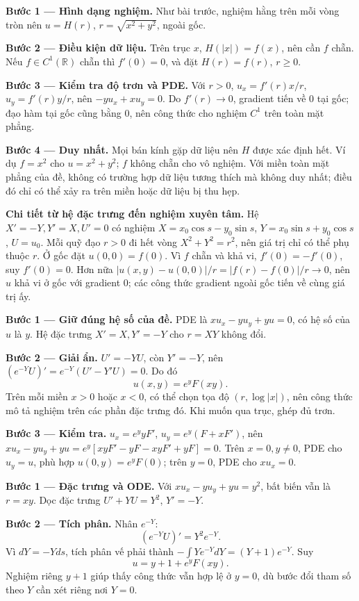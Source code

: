 \textbf{Bước 1 — Hình dạng nghiệm.} Như bài trước, nghiệm hằng trên mỗi vòng tròn nên $u=H(r)$, $r=\sqrt{x^2+y^2}$, ngoài gốc.

\textbf{Bước 2 — Điều kiện dữ liệu.} Trên trục $x$, $H(|x|)=f(x)$, nên cần $f$ chẵn. Nếu $f\in C^1(\mathbb R)$ chẵn thì $f'(0)=0$, và đặt $H(r)=f(r)$, $r\ge0$.

\textbf{Bước 3 — Kiểm tra độ trơn và PDE.} Với $r>0$, $u_x=f'(r)x/r$, $u_y=f'(r)y/r$, nên $-yu_x+xu_y=0$. Do $f'(r)\to0$, gradient tiến về 0 tại gốc; đạo hàm tại gốc cũng bằng 0, nên công thức cho nghiệm $C^1$ trên toàn mặt phẳng.

\textbf{Bước 4 — Duy nhất.} Mọi bán kính gặp dữ liệu nên $H$ được xác định hết. Ví dụ $f=x^2$ cho $u=x^2+y^2$; $f$ không chẵn cho vô nghiệm. Với miền toàn mặt phẳng của đề, không có trường hợp dữ liệu tương thích mà không duy nhất; điều đó chỉ có thể xảy ra trên miền hoặc dữ liệu bị thu hẹp.

\textbf{Chi tiết từ hệ đặc trưng đến nghiệm xuyên tâm.} Hệ $X'=-Y,Y'=X,U'=0$ có nghiệm $X=x_0\cos s-y_0\sin s$, $Y=x_0\sin s+y_0\cos s$, $U=u_0$. Mỗi quỹ đạo $r>0$ đi hết vòng $X^2+Y^2=r^2$, nên giá trị chỉ có thể phụ thuộc $r$. Ở gốc đặt $u(0,0)=f(0)$. Vì $f$ chẵn và khả vi, $f'(0)=-f'(0)$, suy $f'(0)=0$. Hơn nữa $|u(x,y)-u(0,0)|/r=|f(r)-f(0)|/r\to0$, nên $u$ khả vi ở gốc với gradient $0$; các công thức gradient ngoài gốc tiến về cùng giá trị ấy.

\textbf{Bước 1 — Giữ đúng hệ số của đề.} PDE là $xu_x-yu_y+yu=0$, có hệ số của $u$ là $y$. Hệ đặc trưng $X'=X,Y'=-Y$ cho $r=XY$ không đổi.

\textbf{Bước 2 — Giải ẩn.} $U'=-YU$, còn $Y'=-Y$, nên $(e^{-Y}U)'=e^{-Y}(U'-Y'U)=0$. Do đó
\[u(x,y)=e^yF(xy).\]
Trên mỗi miền $x>0$ hoặc $x<0$, có thể chọn tọa độ $(r,\log|x|)$, nên công thức mô tả nghiệm trên các phần đặc trưng đó. Khi muốn qua trục, ghép đủ trơn.

\textbf{Bước 3 — Kiểm tra.} $u_x=e^y yF'$, $u_y=e^y(F+xF')$, nên $xu_x-yu_y+yu=e^y[xyF'-yF-xyF'+yF]=0$. Trên $x=0,y\ne0$, PDE cho $u_y=u$, phù hợp $u(0,y)=e^yF(0)$; trên $y=0$, PDE cho $xu_x=0$.

\textbf{Bước 1 — Đặc trưng và ODE.} Với $xu_x-yu_y+yu=y^2$, bất biến vẫn là $r=xy$. Dọc đặc trưng $U'+YU=Y^2$, $Y'=-Y$.

\textbf{Bước 2 — Tích phân.} Nhân $e^{-Y}$:
\[(e^{-Y}U)'=Y^2e^{-Y}.\]
Vì $dY=-Yds$, tích phân vế phải thành $-\int Ye^{-Y}dY=(Y+1)e^{-Y}$. Suy
\[u=y+1+e^yF(xy).\]
Nghiệm riêng $y+1$ giúp thấy công thức vẫn hợp lệ ở $y=0$, dù bước đổi tham số theo $Y$ cần xét riêng nơi $Y=0$.

